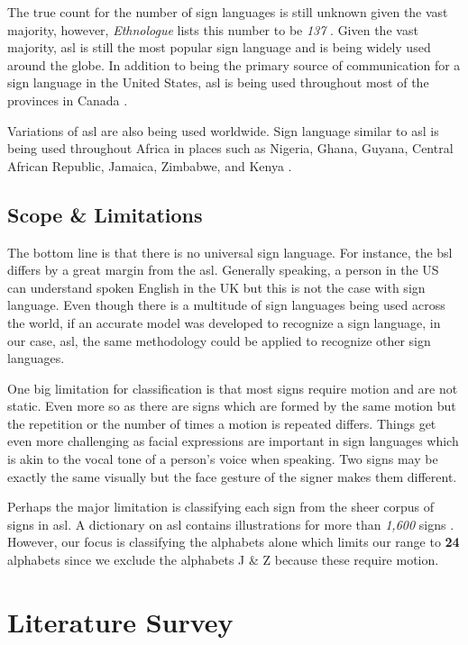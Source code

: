 \documentclass[twocolumn]{article}
\begin{document}
The true count for the number of sign languages is still unknown given the 
vast majority, however, \textit{Ethnologue} \cite{ethnologue} lists this 
number to be \textit{137} \cite{fenlon2015sign}. Given the vast majority, 
\gls{asl} is still the most popular sign language and is being widely used 
around the globe. In addition to being the primary source of communication for 
a sign language in the United States, \gls{asl} is being used throughout most 
of the provinces in Canada \cite{al2010sign}.

Variations of \gls{asl} are also being used worldwide. Sign language 
similar to \gls{asl} is being used throughout Africa in places such as 
Nigeria, Ghana, Guyana, Central African Republic, Jamaica, Zimbabwe, and 
Kenya \cite{nyst2010sign}.

\subsection{Scope \& Limitations}
The bottom line is that there is no universal sign language. For instance, the 
\gls{bsl} differs by a great margin from the \gls{asl}. Generally speaking, a 
person in the US can understand spoken English in the UK but this is not the 
case with sign language. Even though there is a multitude of sign languages being used across the 
world, if an accurate model was developed to recognize a sign language, in 
our case, \gls{asl}, the same methodology could be applied to recognize other 
sign languages.

One big limitation for classification is that most signs require motion and 
are not static. Even more so as there are signs which are formed by the same 
motion but the repetition or the number of times a motion is repeated differs. 
Things get even more challenging as facial expressions are important in sign 
languages which is akin to the vocal tone of a person's voice when speaking. 
Two signs may be exactly the same visually but the face gesture of the signer 
makes them different.

Perhaps the major limitation is classifying each sign from the sheer corpus of 
signs in \gls{asl}. A dictionary on \gls{asl} contains illustrations for more 
than \textit{1,600} signs \cite{tennant1998american}. However, our focus is 
classifying the alphabets alone which limits our range to \textbf{24} 
alphabets since we exclude the alphabets J \& Z because these require motion.

\section{Literature Survey}
\end{document}
